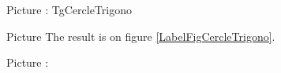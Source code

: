 

Picture : TgCercleTrigono
\begin{center}
   
\end{center}

Picture 
The result is on figure \ref{LabelFigCercleTrigono}. %
\newcommand{\CaptionFigCercleTrigono}{<+Type your caption here+>}



Picture : 
\begin{center}
   
\end{center}





%   


